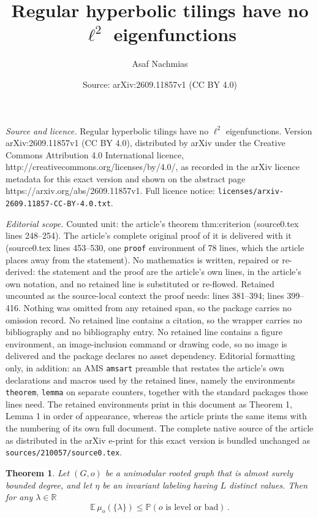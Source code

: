 \documentclass[10pt,a4paper]{amsart}
\title{Regular hyperbolic tilings have no $\ell^2$ eigenfunctions}
\author{Asaf Nachmias}
\date{Source: arXiv:2609.11857v1 (CC BY 4.0)}
\newtheorem{theorem}{Theorem}
\newcommand{\R}{\mathbb R}
\begin{document}
\maketitle

\noindent\emph{Source and licence.} Regular hyperbolic tilings have no $\ell^2$ eigenfunctions. Version arXiv:2609.11857v1 (CC BY 4.0), distributed by arXiv under the Creative Commons Attribution 4.0 International licence, http://creativecommons.org/licenses/by/4.0/, as recorded in the arXiv licence metadata for this exact version and shown on the abstract page https://arxiv.org/abs/2609.11857v1. Full licence notice: \texttt{licenses/arxiv-2609.11857-CC-BY-4.0.txt}.\par\smallskip

\noindent\textit{Editorial scope.} Counted unit: the article's theorem thm:criterion (source0.tex lines 248--254). The article's complete original proof of it is delivered with it (source0.tex lines 453--530, one \texttt{proof} environment of 78 lines, which the article places away from the statement). No mathematics is written, repaired or re-derived: the statement and the proof are the article's own lines, in the article's own notation, and no retained line is substituted or re-flowed.  Retained uncounted as the source-local context the proof needs: lines 381--394; lines 399--416.  Nothing was omitted from any retained span, so the package carries no omission record.  No retained line contains a citation, so the wrapper carries no bibliography and no bibliography entry.  No retained line contains a figure environment, an image-inclusion command or drawing code, so no image is delivered and the package declares no asset dependency.  Editorial formatting only, in addition: an AMS \texttt{amsart} preamble that restates the article's own declarations and macros used by the retained lines, namely the environments \texttt{theorem}, \texttt{lemma} on separate counters, together with the standard packages those lines need.  The retained environments print in this document as Theorem 1, Lemma 1 in order of appearance, whereas the article prints the same items with the numbering of its own full document.  The complete native source of the article as distributed in the arXiv e-print for this exact version is bundled unchanged as \texttt{sources/210057/source0.tex}.
\begin{theorem}\label{thm:Bordenave} 
Let $(G,o)$ be a unimodular rooted graph that is almost surely bounded degree, and let $\eta$ be an invariant labeling having $L$ distinct values. Then for any $\lambda\in \R$
\[
\mathbb E\,\mu_o(\{\lambda\})
\le
\mathbb P(o\text{ is level or bad}) \, . \]

\end{theorem}
\end{document}
